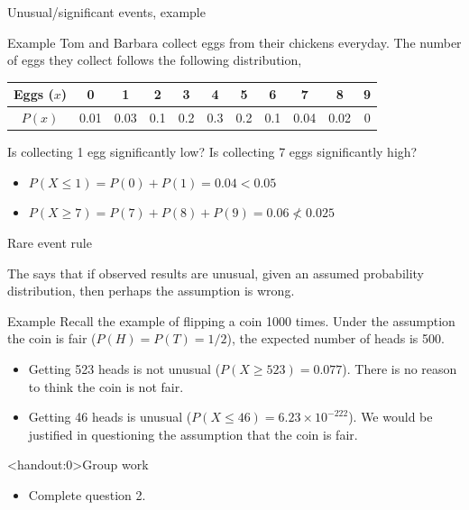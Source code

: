 \documentclass[xcolor=table, aspectratio=169, bigger, handout]{beamer}
\begin{document}
\begin{frame}{Unusual/significant events, example}
\begin{exampleblock}{Example}
Tom and Barbara collect eggs from their chickens everyday. The number of eggs they collect follows the following distribution,\\
\smallskip
{\centering
\begin{tabular}{c|cccccccccc}
Eggs ($x$) & 0 & 1 & 2 & 3 & 4 & 5 & 6 & 7 & 8 & 9 \\
\hline
$P(x)$ & 0.01 & 0.03 & 0.1 & 0.2 & 0.3 & 0.2 & 0.1 & 0.04 & 0.02 & 0
\end{tabular}\par
}
\medskip
Is collecting 1 egg significantly low? Is collecting 7 eggs significantly high?
\begin{itemize}
\pause\item $P(X\le 1) = P(0) + P(1) = 0.04  < 0.05$\\
\pause\item $P(X \ge 7) = P(7) + P(8) + P(9) = 0.06 \not < 0.025$\\
\end{itemize}
\end{exampleblock}
\end{frame}

\begin{frame}{Rare event rule}
\begin{block}{}
The  says that if observed results are unusual, given an assumed probability distribution, then perhaps the assumption is wrong.
\end{block}
\pause
\begin{exampleblock}{Example}
Recall the example of flipping a coin 1000 times. Under the assumption the coin is fair ($P(H) = P(T) = 1/2$), the expected number of heads is 500.
\begin{itemize}
\pause\item Getting 523 heads is not unusual ($P(X \ge 523) = 0.077$). There is no reason to think the coin is not fair.
\pause\item Getting 46 heads is unusual ($P(X \le 46) = 6.23 \times 10^{-222}$). We would be justified in questioning the assumption that the coin is fair.
\end{itemize}
\end{exampleblock}
\end{frame}



\begin{frame}<handout:0>{Group work}
\begin{block}{}
\large
\begin{itemize}
\item Complete question 2.
\end{itemize}
\end{block}
\end{frame}
\end{document}
